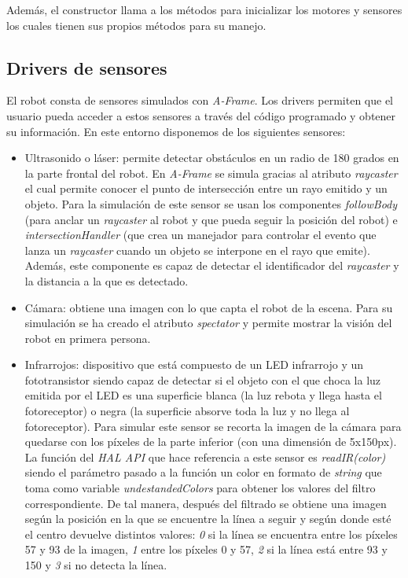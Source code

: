 Además, el constructor llama a los métodos para inicializar los motores y sensores los cuales tienen sus propios métodos para su manejo. 

\subsection{Drivers de sensores}
\label{subsec:driversSensores}
El robot consta de sensores simulados con \textit{A-Frame}. Los drivers permiten que el usuario pueda acceder a estos sensores a través del código programado y obtener su información. En este entorno disponemos de los siguientes sensores: 

\begin{itemize}
    \item Ultrasonido o láser: permite detectar obstáculos en un radio de 180 grados en la parte frontal del robot. En \textit{A-Frame} se simula gracias al atributo \textit{raycaster} el cual permite conocer el punto de intersección entre un rayo emitido y un objeto. Para la simulación de este sensor se usan los componentes \textit{followBody} (para anclar un \textit{raycaster} al robot y que pueda seguir la posición del robot) e \textit{intersectionHandler} (que crea un manejador para controlar el evento que lanza un \textit{raycaster} cuando un objeto se interpone en el rayo que emite). Además, este componente es capaz de detectar el identificador del \textit{raycaster} y la distancia a la que es detectado.
    
    \item Cámara: obtiene una imagen con lo que capta el robot de la escena. Para su simulación se ha creado el atributo \textit{spectator} y permite mostrar la visión del robot en primera persona. 
    
    \item Infrarrojos: dispositivo que está compuesto de un LED infrarrojo y un fototransistor siendo capaz de detectar si el objeto con el que choca la luz emitida por el LED es una superficie blanca (la luz rebota y llega hasta el fotoreceptor) o negra (la superficie absorve toda la luz y no llega al fotoreceptor). 
    Para simular este sensor se recorta la imagen de la cámara para quedarse con los píxeles de la parte inferior (con una dimensión de 5x150px). La función del \textit{HAL API} que hace referencia a este sensor es \textit{readIR(color)} siendo el parámetro pasado a la función un color en formato de \textit{string} que toma como variable \textit{undestandedColors} para obtener los valores del filtro correspondiente. De tal manera, después del filtrado se obtiene una imagen según la posición en la que se encuentre la línea a seguir y según donde esté el centro devuelve distintos valores: \textit{0} si la línea se encuentra entre los píxeles 57 y 93 de la imagen, \textit{1} entre los píxeles 0 y 57, \textit{2} si la línea está entre 93 y 150 y \textit{3} si no detecta la línea.
    

\end{itemize}
